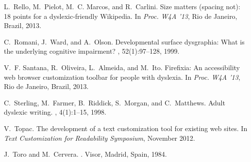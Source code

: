 \documentclass[letterpaper]{sig-alternate-2013}
\begin{document}
\begin{thebibliography}{10}
L.~Rello, M.~Pielot, M.~C. Marcos, and R.~Carlini.
\newblock Size matters (spacing not): 18 points for a dyslexic-friendly
  {W}ikipedia.
\newblock In {\em Proc. W4A '13}, Rio de Janeiro, Brazil, 2013.

C.~Romani, J.~Ward, and A.~Olson.
\newblock Developmental surface dysgraphia: What is the underlying cognitive
  impairment?
,
  52(1):97--128, 1999.

V.~F. Santana, R.~Oliveira, L.~Almeida, and M.~Ito.
\newblock Firefixia: An accessibility web browser customization toolbar for
  people with dyslexia.
\newblock In {\em Proc. W4A '13}, Rio de Janeiro, Brazil, 2013.

C.~Sterling, M.~Farmer, B.~Riddick, S.~Morgan, and C.~Matthews.
\newblock Adult dyslexic writing.
, 4(1):1--15, 1998.

V.~Topac.
\newblock The development of a text customization tool for existing web sites.
\newblock In {\em Text Customization for Readability Symposium}, November 2012.

J.~Toro and M.~Cervera.
.
\newblock Visor, Madrid, Spain, 1984.

\end{thebibliography}


\balancecolumns
\end{document}
